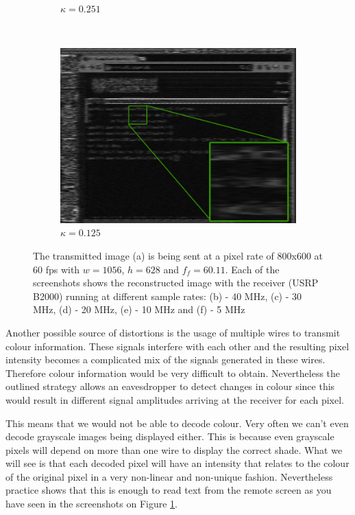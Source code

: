 \documentclass[a4paper,12pt,twoside,openright]{report}
\begin{document}
\begin{figure}[p!]
\begin{subfigure}[b]{0.45\textwidth}
  \caption{$\kappa = 0.251$}
\end{subfigure} ~
\begin{subfigure}[b]{0.45\textwidth}
  \includegraphics[width=\textwidth]{sr_5MHz_at_190MHz}
  \caption{$\kappa = 0.125$}
\end{subfigure}
\caption{The transmitted image (a) is being sent at a pixel rate of 800x600 at 60 fps with $w = 1056$, $h = 628$ and $f_{f} = 60.11$. Each of the screenshots shows the reconstructed image with the receiver (USRP B2000) running at different sample rates: (b) - 40 MHz, (c) - 30 MHz, (d) - 20 MHz, (e) - 10 MHz and (f) - 5 MHz}
\label{fig:samplerates}
\end{figure}

Another possible source of distortions is the usage of multiple wires to transmit colour information. These signals interfere with each other and the resulting pixel intensity becomes a complicated mix of the signals generated in these wires. Therefore colour information would be very difficult to obtain. Nevertheless the outlined strategy allows an eavesdropper to detect changes in colour since this would result in different signal amplitudes arriving at the receiver for each pixel.

This means that we would not be able to decode colour. Very often we can't even decode grayscale images being displayed either. This is because even grayscale pixels will depend on more than one wire to display the correct shade. What we will see is that each decoded pixel will have an intensity that relates to the colour of the original pixel in a very non-linear and non-unique fashion. Nevertheless practice shows that this is enough to read text from the remote screen as you have seen in the screenshots on Figure \ref{fig:samplerates}.
\end{document}

